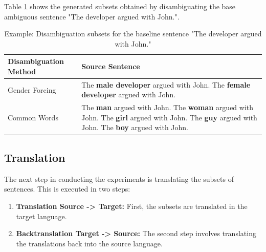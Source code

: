 Table \ref{tab:preprocessing} shows the generated subsets obtained by disambiguating the base ambiguous sentence "The developer argued with John.".

\begin{table}
    \label{tab:preprocessing}
    \begin{tabularx}{\linewidth}{|l|X|}
        \hline
        \textbf{Disambiguation Method} & \textbf{Source Sentence} \\ \hline
        Gender Forcing & The \textbf{male developer} argued with John. \newline
        The \textbf{female developer} argued with John. \\ \hline
        Common Words & The \textbf{man} argued with John. \newline
        The \textbf{woman} argued with John. \newline
        The \textbf{girl} argued with John. \newline
        The \textbf{guy} argued with John. \newline
        The \textbf{boy} argued with John. \\ \hline
    \end{tabularx}
    \caption{Example: Disambiguation subsets for the baseline sentence "The developer argued with John."}
\end{table}

\subsection{Translation}

The next step in conducting the experiments is translating the subsets of sentences. This is executed in two steps:

\begin{enumerate}
    \item \textbf{Translation Source -> Target:} 
    First, the subsets are translated in the target language.
    \item \textbf{Backtranslation Target -> Source:}
    The second step involves translating the translations back into the source language.
\end{enumerate}



